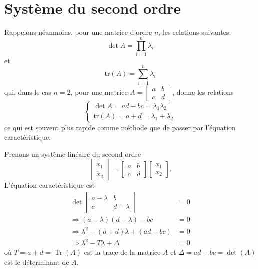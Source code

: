     \section{Système du second ordre}
        Rappelons néanmoins, pour une matrice d'ordre $n$, les relations suivantes:
        \begin{equation}
            \det A=\prod_{i=1}^{n} \lambda_i
        \end{equation}
        et
        \begin{equation}
            \text{tr}(A)=\sum_{i=1}^{n} \lambda_i
        \end{equation}
        qui, dans le cas $n=2$, pour une matrice $A=\begin{bmatrix}a & b\\c & d\end{bmatrix}$, donne les relations
        \begin{equation}\label{eq:valeurs_propres}
            \begin{cases}
                \det A=ad-bc=\lambda_1 \lambda_2\\
                \text{tr}(A)=a+d=\lambda_1 + \lambda_2
            \end{cases}
        \end{equation}
        ce qui est souvent plus rapide comme méthode que de passer par l'équation caractéristique.
            
        Prenons un système linéaire du second ordre
        \begin{equation}
            \begin{bmatrix} \dot{x}_1 \\ \dot{x}_2 \end{bmatrix}=
            \begin{bmatrix} a & b \\ c & d \end{bmatrix} 
            \begin{bmatrix} x_1 \\ x_2 \end{bmatrix}.
        \end{equation}
        L'équation caractéristique est
        \begin{equation}
            \begin{split}
                \det \begin{bmatrix} 
                        a - \lambda & b \\
                        c & d - \lambda 
                        \end{bmatrix} &= 0 \\
                \Rightarrow (a - \lambda)(d - \lambda) - bc &= 0 \\
                \Rightarrow \lambda^2 - (a + d) \lambda + (ad - bc) &= 0 \\
                \Rightarrow \lambda^2 - T \lambda + \Delta &= 0
            \end{split}
        \end{equation}
        où $T=a + d=\operatorname{Tr}(A)$ est la trace de la matrice $A$ et $\Delta=ad - bc=\det(A)$ est le déterminant de $A$.

